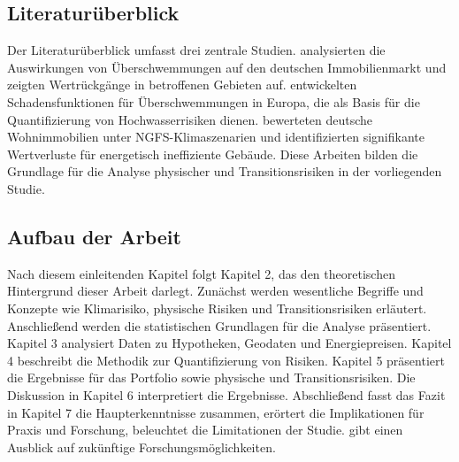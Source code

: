 \subsection{Literaturüberblick }
Der Literaturüberblick umfasst drei zentrale Studien. \textcite{moore2022flood} analysierten die Auswirkungen von Überschwemmungen auf den deutschen Immobilienmarkt und zeigten Wertrückgänge in betroffenen Gebieten auf.  entwickelten Schadensfunktionen für Überschwemmungen in Europa, die als Basis für die Quantifizierung von Hochwasserrisiken dienen. \textcite{tergerman} bewerteten deutsche Wohnimmobilien unter NGFS-Klimaszenarien und identifizierten signifikante Wertverluste für energetisch ineffiziente Gebäude. Diese Arbeiten bilden die Grundlage für die Analyse physischer und Transitionsrisiken in der vorliegenden Studie.

\subsection{Aufbau der Arbeit}

Nach diesem einleitenden Kapitel folgt Kapitel 2, das den theoretischen Hintergrund dieser Arbeit darlegt. Zunächst werden wesentliche Begriffe und Konzepte wie Klimarisiko, physische Risiken und Transitionsrisiken erläutert. Anschließend werden die statistischen Grundlagen für die Analyse präsentiert. Kapitel 3 analysiert Daten zu Hypotheken, Geodaten und Energiepreisen. Kapitel 4 beschreibt die Methodik zur Quantifizierung von Risiken. Kapitel 5 präsentiert die Ergebnisse für das Portfolio sowie physische und Transitionsrisiken. Die Diskussion in Kapitel 6 interpretiert die Ergebnisse. Abschließend fasst das Fazit in Kapitel 7 die Haupterkenntnisse zusammen, erörtert die Implikationen für Praxis und Forschung, beleuchtet die Limitationen der Studie. gibt einen Ausblick auf zukünftige Forschungsmöglichkeiten.
